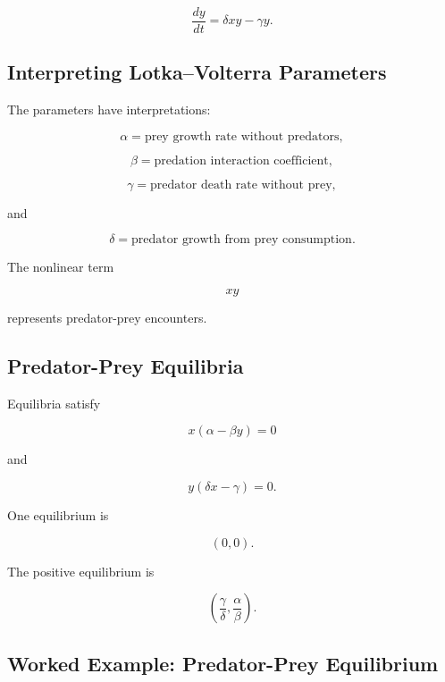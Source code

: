 \[
\boxed{
\frac{dy}{dt}
=
\delta xy-\gamma y.
}
\]

\subsection{Interpreting Lotka--Volterra Parameters}
\label{subsec:lotka-volterra-parameters}

The parameters have interpretations:

\[
\alpha
=
\text{prey growth rate without predators},
\]

\[
\beta
=
\text{predation interaction coefficient},
\]

\[
\gamma
=
\text{predator death rate without prey},
\]

and

\[
\delta
=
\text{predator growth from prey consumption}.
\]

The nonlinear term

\[
xy
\]

represents predator-prey encounters.

\subsection{Predator-Prey Equilibria}
\label{subsec:predator-prey-equilibria}

Equilibria satisfy

\[
x(\alpha-\beta y)=0
\]

and

\[
y(\delta x-\gamma)=0.
\]

One equilibrium is

\[
\boxed{
(0,0).
}
\]

The positive equilibrium is

\[
\boxed{
\left(
\frac{\gamma}{\delta},
\frac{\alpha}{\beta}
\right).
}
\]

\subsection{Worked Example: Predator-Prey Equilibrium}
\label{subsec:worked-predator-prey-equilibrium}

